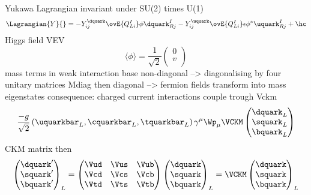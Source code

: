 Yukawa Lagrangian invariant under SU(2) times U(1)
%
\begin{equation}
  \Lagrangian{Y}{} = -Y_{ij}^{\dquark} \ovE{Q_{Li}^{I}} \phi \dquark_{Rj}^{I} - Y_{ij}^{\uquark} \ovE{Q_{Li}^{I}} \epsilon \phi^{\ast} \uquark_{Rj}^{I} + \hc
\end{equation}
%
Higgs field VEV
%
\begin{equation}
  \langle\phi\rangle = \frac{1}{\sqrt{2}} \begin{pmatrix}
    0 \\
    v \\
  \end{pmatrix}
\end{equation}
%
mass terms in weak interaction base non-diagonal --> diagonalising by four unitary matrices
Mdiag then diagonal --> fermion fields transform into mass eigenstates
consequence: charged current interactions couple trough Vckm
%
\begin{equation}
  \frac{-g}{\sqrt{2}} \left( \uquarkbar_L, \cquarkbar_L, \tquarkbar_L \right) \gamma^\mu \Wp_\mu \VCKM 
  \begin{pmatrix}
    \dquark_L \\
    \squark_L \\
    \bquark_L \\
  \end{pmatrix}
\end{equation}
%
CKM matrix then 
%
\begin{equation}
  \begin{pmatrix}
    \dquark^\prime \\
    \squark^\prime \\
    \bquark^\prime \\
  \end{pmatrix}_L
  = 
  \begin{pmatrix}
    \Vud & \Vus & \Vub \\
    \Vcd & \Vcs & \Vcb \\
    \Vtd & \Vts & \Vtb \\
  \end{pmatrix}
  \begin{pmatrix}
    \dquark \\
    \squark \\
    \bquark \\
  \end{pmatrix}_L
  = \VCKM
  \begin{pmatrix}
    \dquark \\
    \squark \\
    \bquark \\
  \end{pmatrix}_L
\end{equation}
